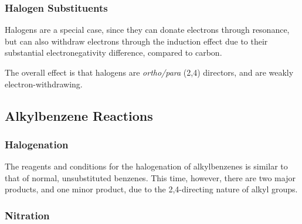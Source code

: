 
			\subsubsection{Halogen Substituents}

				Halogens are a special case, since they can donate electrons through resonance, but can also withdraw electrons through
				the induction effect due to their substantial electronegativity difference, compared to carbon.

				The overall effect is that halogens are \textit{ortho/para} (2,4) directors, and are weakly electron-withdrawing.



		\pagebreak
		\subsection{Alkylbenzene Reactions}

			\subsubsection{Halogenation}
				The reagents and conditions for the halogenation of alkylbenzenes is similar to that of normal, unsubstituted benzenes. This
				time, however, there are two major products, and one minor product, due to the 2,4-directing nature of alkyl groups.



			\subsubsection{Nitration}

